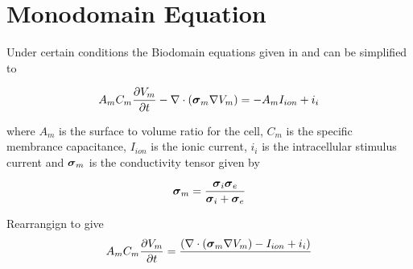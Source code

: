 \section{Monodomain Equation}
\label{sec:MonodomainEquation}

Under certain conditions the Biodomain equations given in
 and  can be simplified to 

\begin{equation}
  A_{m}C_{m}\delby{V_{m}}{t}-\divergence{}{\pbrac{\tensor{\sigma}_{m}\grad{V_{m}}}}=-A_{m}I_{ion}+i_{i}
  \label{eqn:monodomain}
\end{equation}

where $A_{m}$ is the surface to volume ratio for the cell, $C_{m}$ is
the specific membrance capacitance, $I_{ion}$ is the ionic current, $i_{i}$ is the
intracellular stimulus current and $\boldsymbol{\mathit{\sigma}}_{m}$ is the
conductivity tensor given by

\begin{equation}
  \tensor{\sigma}_{m}=\dfrac{\tensor{\sigma}_{i}\tensor{\sigma}_{e}}{\tensor{\sigma}_{i}+\tensor{\sigma}_{e}}
  \label{eqn:monodomainconductivity}
\end{equation}

Rearrangign  to give
\begin{equation}
  A_{m}C_{m}\delby{V_{m}}{t}=\dfrac{\pbrac{\divergence{}{\pbrac{\tensor{\sigma}_{m}\grad{V_{m}}}}-I_{ion}+i_{i}}}{}
\end{equation}
